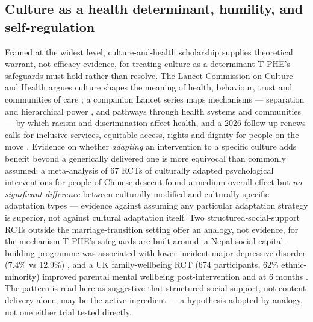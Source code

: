 \documentclass[11pt]{article}
\newcommand{\tphe}{T\mbox{-}PHE}
\begin{document}
\subsection{Culture as a health determinant, humility, and self-regulation}
Framed at the widest level, culture-and-health scholarship supplies theoretical warrant, not efficacy evidence, for treating culture as a determinant \tphe{}'s safeguards must hold rather than resolve. The Lancet Commission on Culture and Health argues culture shapes the meaning of health, behaviour, trust and communities of care \cite{ref85}; a companion Lancet series maps mechanisms --- separation and hierarchical power \cite{ref86}, and pathways through health systems and communities \cite{ref87} --- by which racism and discrimination affect health, and a 2026 follow-up renews calls for inclusive services, equitable access, rights and dignity for people on the move \cite{ref88}. Evidence on whether \emph{adapting} an intervention to a specific culture adds benefit beyond a generically delivered one is more equivocal than commonly assumed: a meta-analysis of 67 RCTs of culturally adapted psychological interventions for people of Chinese descent found a medium overall effect but \emph{no significant difference} between culturally modified and culturally specific adaptation types \cite{ref89} --- evidence against assuming any particular adaptation strategy is superior, not against cultural adaptation itself. Two structured-social-support RCTs outside the marriage-transition setting offer an analogy, not evidence, for the mechanism \tphe{}'s safeguards are built around: a Nepal social-capital-building programme was associated with lower incident major depressive disorder (7.4\% vs 12.9\%) \cite{ref90}, and a UK family-wellbeing RCT (674 participants, 62\% ethnic-minority) improved parental mental wellbeing post-intervention and at 6 months \cite{ref91}. The pattern is read here as suggestive that structured social support, not content delivery alone, may be the active ingredient --- a hypothesis adopted by analogy, not one either trial tested directly.
\end{document}

